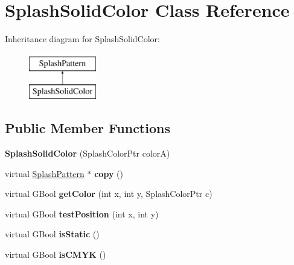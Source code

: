 \hypertarget{class_splash_solid_color}{}\section{Splash\+Solid\+Color Class Reference}
\label{class_splash_solid_color}
Inheritance diagram for Splash\+Solid\+Color\+:\begin{figure}[H]
\begin{center}
\leavevmode
\includegraphics[height=2.000000cm]{class_splash_solid_color}
\end{center}
\end{figure}
\subsection*{Public Member Functions}
\begin{DoxyCompactItemize}
\item 
\mbox{\label{class_splash_solid_color_a69950aa063d80ae14ecd2a704c59b334}} 
{\bfseries Splash\+Solid\+Color} (Splash\+Color\+Ptr colorA)
\item 
\mbox{\label{class_splash_solid_color_a408dde1eef9f59eaf87a326045504104}} 
virtual \hyperlink{class_splash_pattern}{Splash\+Pattern} $\ast$ {\bfseries copy} ()
\item 
\mbox{\label{class_splash_solid_color_a94508c7c8ffc6f55aea86b0a768376c8}} 
virtual G\+Bool {\bfseries get\+Color} (int x, int y, Splash\+Color\+Ptr c)
\item 
\mbox{\label{class_splash_solid_color_a4aab6d9f107bda72969429d4e23fffd2}} 
virtual G\+Bool {\bfseries test\+Position} (int x, int y)
\item 
\mbox{\label{class_splash_solid_color_ae55cd4783dece22f1e5a3c56ab34baf2}} 
virtual G\+Bool {\bfseries is\+Static} ()
\item 
\mbox{\label{class_splash_solid_color_a5bd92ca87e7c832dbdf9768db111788f}} 
virtual G\+Bool {\bfseries is\+C\+M\+YK} ()
\end{DoxyCompactItemize}


